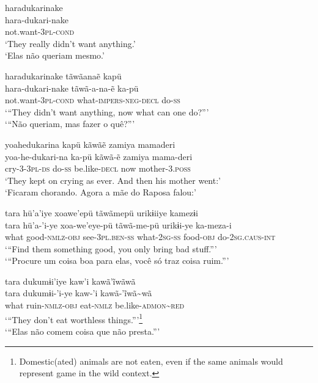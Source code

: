 \documentclass[output=paper,
modfonts,nonflat
]{langsci/langscibook}
\begin{document}
\ea  haradukarinake  \\[.3em]
\gll hara-dukari-nake\\
not.want-\textsc{3pl-cond}\\
\glt `They really didn't want anything.' \\
 `Elas não queriam mesmo.' \\ 
\z 

\newpage 
\ea   	haradukarinake tãwãanaẽ kapü  \\[.3em]
\gll 	hara-dukari-nake tãwã-a-na-ẽ ka-pü\\
not.want-\textsc{3pl-cond} what-\textsc{impers-neg-decl} do-\textsc{ss}\\
\glt   `{``}They didn't want anything, now what can one do?{''}'\\
`{``}Não queriam, mas fazer o quê?{''}' \\                                   
\z   

\ea   yoahedukarina kapü kãwãẽ  zamiya mamaderi  \\[.3em]
\gll 	yoa-he-dukari-na ka-pü kãwã-ẽ  zamiya mama-deri\\
cry-\textsc{3-3pl-ds} do-\textsc{ss} be.like-\textsc{decl} now mother-\textsc{3.poss}\\
\glt  `They kept on crying as ever. And then his mother went:'  \\
`Ficaram chorando.  Agora a mãe do Raposa falou:'\\
\z  

\ea   tara hü'a'iye xoawe'epü tãwãmepü urikɨiiye kamezɨi  \\[.3em]
\gll 	 tara hü'a-'i-ye xoa-we'eye-pü tãwã-me-pü urikɨi-ye ka-meza-i\\
what good-\textsc{nmlz-obj} see-\textsc{3pl.ben-ss}  what-\textsc{2sg-ss} food-\textsc{obj}	do-\textsc{2sg.caus-int}\\
\glt `{``}Find them something good, you only bring bad stuff.{''}'  \\
`{``}Procure um coisa boa para elas, você só traz coisa ruim.{''}'\\
\z  


\ea   tara dukumɨi'iye kaw'i kawã'ĩwãwã  \\[.3em]
\gll 	tara dukumɨi-'i-ye kaw-'i kawã-'ĩwã\textasciitilde wã\\
what ruin-\textsc{nmlz-obj} eat-\textsc{nmlz} be.like-\textsc{admon}\textasciitilde \textsc{red}\\
\glt  `{``}They don't eat worthless things.{''}'\footnote{Domestic(ated) animals are not eaten, even if the same animals would represent game in the wild context.} \\
`{``}Elas não comem coisa que não presta.{''}'\\
\z  
 
\end{document}
